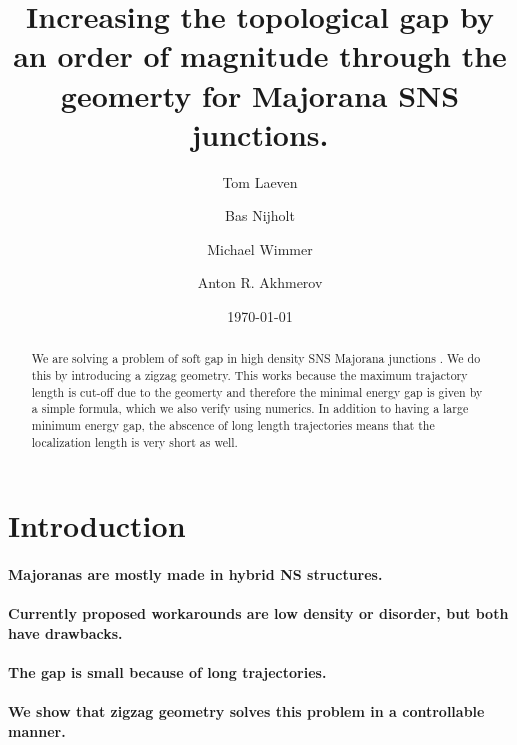 \documentclass[english, twocolumn, 10pt, aps, superscriptaddress, floatfix, prb, citeautoscript]{revtex4-1}
\renewcommand{\comment}[2]{#2}
\renewcommand{\comment}{\paragraph}
\begin{document}
\title{Increasing the topological gap by an order of magnitude through the geomerty for Majorana SNS junctions.}

\author{Tom Laeven}

\author{Bas Nijholt}

\author{Michael Wimmer}

\author{Anton R. Akhmerov}

\date{\today}

\begin{abstract}
We are solving a problem of soft gap in high density SNS Majorana junctions \cite{pientka2017topological}.
We do this by introducing a zigzag geometry.
This works because the maximum trajactory length is cut-off due to the geomerty and therefore the minimal energy gap is given by a simple formula, which we also verify using numerics.
In addition to having a large minimum energy gap, the abscence of long length trajectories means that the localization length is very short as well.
\end{abstract}

\maketitle


\section{Introduction}

\comment{Majoranas are mostly made in hybrid NS structures.}
\comment{Currently proposed workarounds are low density or disorder, but both have drawbacks.}
\comment{The gap is small because of long trajectories.}
\comment{We show that zigzag geometry solves this problem in a controllable manner.}
\end{document}
